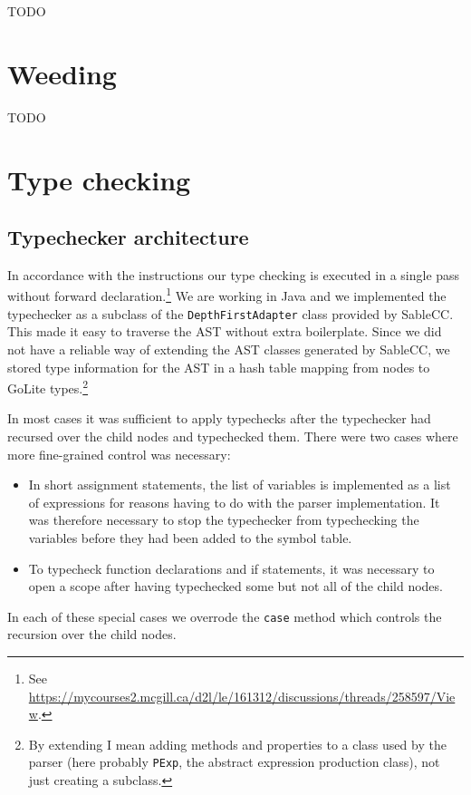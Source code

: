\documentclass[oneside]{article}
\begin{document}
TODO

\section{Weeding}

TODO

\section{Type checking}
\subsection{Typechecker architecture}

In accordance with the instructions our type checking is executed in a single pass without forward declaration.\footnote{See \url{https://mycourses2.mcgill.ca/d2l/le/161312/discussions/threads/258597/View}.} We are working in Java and we implemented the typechecker as a subclass of the \verb|DepthFirstAdapter| class provided by SableCC. This made it easy to traverse the AST without extra boilerplate. Since we did not have a reliable way of extending the AST classes generated by SableCC, we stored type information for the AST in a hash table mapping from nodes to GoLite types.\footnote{By extending I mean adding methods and properties to a class used by the parser (here probably \texttt{PExp}, the abstract expression production class), not just creating a subclass.}

In most cases it was sufficient to apply typechecks after the typechecker had recursed over the child nodes and typechecked them. There were two cases where more fine-grained control was necessary:

\begin{itemize}
    \item In short assignment statements, the list of variables is implemented as a list of expressions for reasons having to do with the parser implementation. It was therefore necessary to stop the typechecker from typechecking the variables before they had been added to the symbol table.
    \item To typecheck function declarations and if statements, it was necessary to open a scope after having typechecked some but not all of the child nodes.
\end{itemize}

In each of these special cases we overrode the \verb|case| method which controls the recursion over the child nodes.
\end{document}
